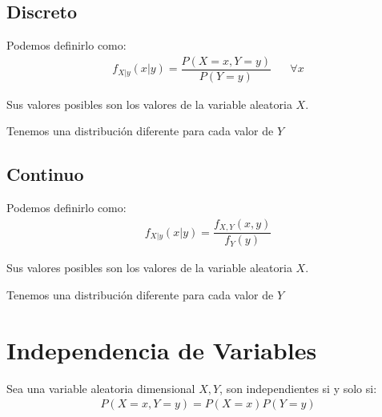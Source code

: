 \documentclass[12pt, fleqn]{report}                             %
\DeclareMathOperator \Space {\quad}                             %
\theoremstyle{break}                                            %
\begin{document}
            \subsection{Discreto}

                Podemos definirlo como:
                \begin{align*}
                    f_{X | y}(x | y) = \dfrac{P(X = x, Y = y)}{P(Y = y)} \Space \forall x
                \end{align*}

                Sus valores posibles son los valores de la variable aleatoria $X$.

                Tenemos una distribución diferente para cada valor de $Y$


            \subsection{Continuo}

                Podemos definirlo como:
                \begin{align*}
                    f_{X | y}(x | y) = \dfrac{f_{X, Y}(x, y)}{f_{Y}(y)}
                \end{align*}

                Sus valores posibles son los valores de la variable aleatoria $X$.

                Tenemos una distribución diferente para cada valor de $Y$



        \clearpage
        \section{Independencia de Variables}

            Sea una variable aleatoria dimensional $X, Y$, son independientes
            si y solo si:
            \begin{align*}
                P(X = x , Y = y) = P(X = x) P(Y = y)
             \end{align*} 
\end{document}
